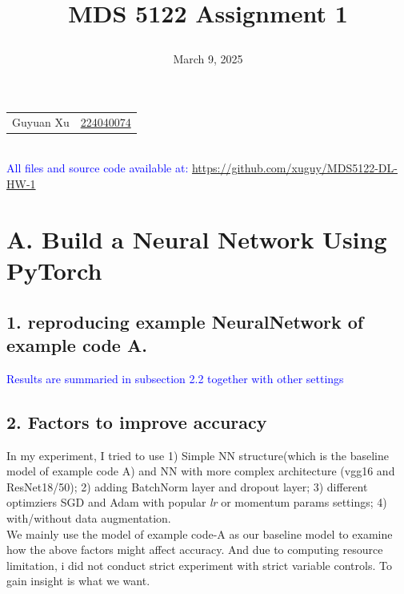 \documentclass{article}
\newcommand{\subs}[1]{\subsection*{#1}}
\newcommand{\secs}[1]{\section*{#1}}
\begin{document}
\title{\raggedright MDS 5122 Assignment 1}
\date{March 9, 2025}
\maketitle

\noindent\begin{tabular}{@{}ll}
   Guyuan Xu &\href{mailto:224040074@link.cuhk.edu.cn}{224040074} \\
    
%
\end{tabular}\\
\textcolor{blue}{All files and source code available at:} \url{https://github.com/xuguy/MDS5122-DL-HW-1}
\secs{A. Build a Neural Network Using PyTorch}
\subs{1. reproducing example NeuralNetwork of example code A.}

\noindent\textcolor{blue}{Results are summaried in subsection 2.2 together with other settings}

\subs{2. Factors to improve accuracy}
In my experiment, I tried to use 1) Simple NN structure(which is the baseline model of example code A) and NN with more complex architecture (vgg16 and ResNet18/50); 2) adding BatchNorm layer and dropout layer; 3) different optimziers SGD and Adam with popular \textit{lr} or momentum params settings; 4) with/without data augmentation. \\

We mainly use the model of example code-A as our baseline model to examine how the above factors might affect accuracy. And due to computing resource limitation, i did not conduct strict experiment with strict variable controls. To gain insight is what we want.\\


\end{document}
